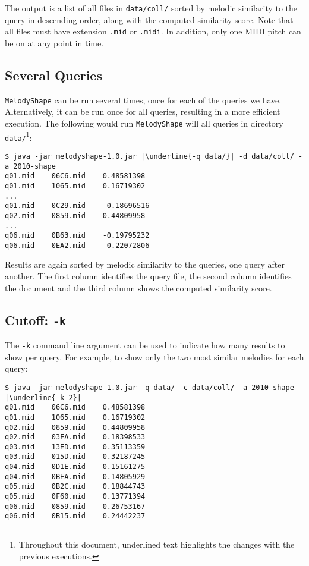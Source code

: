 \documentclass[twoside]{article}
\begin{document}
The output is a list of all files in \texttt{data/coll/} sorted by melodic similarity to the query in descending order, along with the computed similarity score. Note that all files must have extension \texttt{.mid} or \texttt{.midi}. In addition, only one MIDI pitch can be on at any point in time.

\subsection{Several Queries}

\texttt{MelodyShape} can be run several times, once for each of the queries we have. Alternatively, it can be run once for all queries, resulting in a more efficient execution. The following would run \texttt{MelodyShape} will all queries in directory \texttt{data/}\footnote{Throughout this document, underlined text highlights the changes with the previous executions.}:
\begin{lstlisting}
$ java -jar melodyshape-1.0.jar |\underline{-q data/}| -d data/coll/ -a 2010-shape
q01.mid    06C6.mid    0.48581398
q01.mid    1065.mid    0.16719302
...
q01.mid    0C29.mid    -0.18696516
q02.mid    0859.mid    0.44809958
...
q06.mid    0B63.mid    -0.19795232
q06.mid    0EA2.mid    -0.22072806
\end{lstlisting}

Results are again sorted by melodic similarity to the queries, one query after another. The first column identifies the query file, the second column identifies the document and the third column shows the computed similarity score.

\subsection{Cutoff: \texttt{-k}}

The \texttt{-k} command line argument can be used to indicate how many results to show per query. For example, to show only the two most similar melodies for each query:
\begin{lstlisting}
$ java -jar melodyshape-1.0.jar -q data/ -c data/coll/ -a 2010-shape |\underline{-k 2}|
q01.mid    06C6.mid    0.48581398
q01.mid    1065.mid    0.16719302
q02.mid    0859.mid    0.44809958
q02.mid    03FA.mid    0.18398533
q03.mid    13ED.mid    0.35113359
q03.mid    015D.mid    0.32187245
q04.mid    0D1E.mid    0.15161275
q04.mid    0BEA.mid    0.14805929
q05.mid    0B2C.mid    0.18844743
q05.mid    0F60.mid    0.13771394
q06.mid    0859.mid    0.26753167
q06.mid    0B15.mid    0.24442237
\end{lstlisting}
\end{document}

